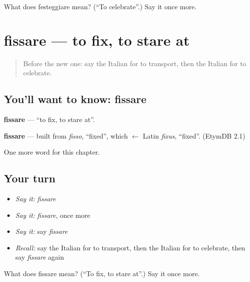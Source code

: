 \begin{tcolorbox}[breakable,colback=teal!4,colframe=teal!35!black,title={Before you move on}]
What does festeggiare mean? (\textquotedblleft{}To celebrate\textquotedblright{}.) Say it once more.
\end{tcolorbox}
\section[fissare]{fissare — to fix, to stare at}

\label{lesson:IT-C149-fissare}



\begin{quote}
Before the new one: say the Italian for to transport, then the Italian for to celebrate.
\end{quote}

\subsection*{You'll want to know: fissare}
\textbf{fissare} — \textquotedblleft{}to fix, to stare at\textquotedblright{}.

\begin{cousinweb}
\textbf{fissare} — built from \emph{fisso}, \textquotedblleft{}fixed\textquotedblright{}, which $\leftarrow$ Latin \emph{fixus}, \textquotedblleft{}fixed\textquotedblright{}. (EtymDB 2.1)
\end{cousinweb}

\begin{grammarlens}[title={What you've built}]
One more word for this chapter.
\end{grammarlens}

\subsection*{Your turn}
\begin{itemize}
\raggedright
  \item \emph{Say it:} \emph{fissare}
  \item \emph{Say it:} \emph{fissare}, once more
  \item \emph{Say it:} say \emph{fissare}
  \item \emph{Recall:} say the Italian for to transport, then the Italian for to celebrate, then say \emph{fissare} again
\end{itemize}

\begin{tcolorbox}[breakable,colback=teal!4,colframe=teal!35!black,title={Before you move on}]
What does fissare mean? (\textquotedblleft{}To fix, to stare at\textquotedblright{}.) Say it once more.
\end{tcolorbox}
